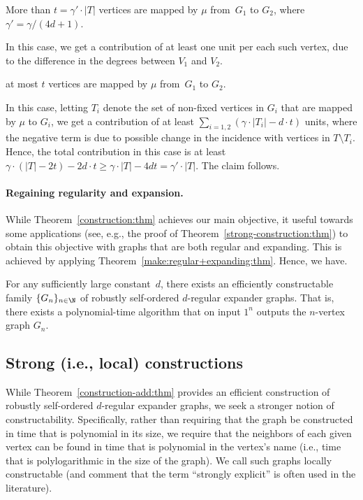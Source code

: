 \BDes
\item[{\em Case 1}:] More than $t=\gamma'\cdot|T|$ vertices are
mapped by $\mu$ from~$G_1$ to $G_2$, where $\gamma'=\gamma/(4d+1)$.

In this case,
we get a contribution of at least one unit per each such vertex,
due to the difference in the degrees between $V_1$ and $V_2$.

\item[{\em Case 2}:] at most $t$ vertices are
mapped by $\mu$ from~$G_1$ to $G_2$.

In this case, letting $T_i$ denote the set of non-fixed
vertices in $G_i$ that are mapped by $\mu$ to $G_i$,
we get a contribution of
at least $\sum_{i=1,2}(\gamma\cdot|T_i|-d\cdot t)$ units,
where the negative term is due to possible change in the incidence
with vertices in $T\setminus T_i$.
Hence, the total contribution in this case is at least
$\gamma\cdot(|T|-2t)-2d\cdot t \geq \gamma\cdot|T|-4dt= \gamma'\cdot|T|$.
%
%
%
\EDes
The claim follows.
\EPFS




\paragraph{Regaining regularity and expansion.}
While Theorem~\ref{construction:thm} achieves our main objective,
it useful towards some applications
(see, e.g., the proof of Theorem~\ref{strong-construction:thm})
to obtain this objective with graphs that are both regular and expanding.
This is achieved by applying Theorem~\ref{make:regular+expanding:thm}.
Hence, we have.

\label{construction-add:thm}
For any sufficiently large constant~$d$,
there exists an efficiently constructable family $\{G_n\}_{n\in\N}$
of robustly self-ordered $d$-regular expander graphs.
That is, there exists a polynomial-time algorithm
that on input $1^n$ outputs the $n$-vertex graph $G_n$.
\ET

\subsection{Strong (i.e., local) constructions}
\label{step3:sec}
%
While Theorem~\ref{construction-add:thm} provides
an efficient construction of
robustly self-ordered $d$-regular expander graphs,
we seek a stronger notion of constructability.
Specifically, rather than requiring that the graph be constructed
in time that is polynomial in its size, we require that the neighbors
of each given vertex can be found in time that is polynomial
in the vertex's name
(i.e., time that is polylogarithmic in the size of the graph).
We call such graphs {\sf locally constructable}
(and comment that the term ``strongly explicit''
is often used in the literature).

